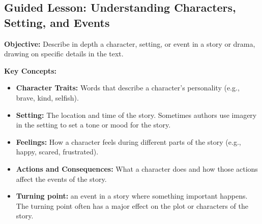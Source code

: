 \documentclass[12pt]{article}
\title{}
\date{}
\begin{document}
\subsection*{Guided Lesson: Understanding Characters, Setting, and Events}
\onehalfspacing

\begin{tcolorbox}[colframe=black!40, colback=gray!5, 
coltitle=black, colbacktitle=black!20, fonttitle=\bfseries\Large, 
title=Learning Objective, halign title=center, left=5pt, right=5pt, top=5pt, bottom=15pt]
\textbf{Objective:} Describe in depth a character, setting, or event in a story or drama, drawing on specific details in the text.
\end{tcolorbox}

\vspace{1em}

\begin{tcolorbox}[colframe=black!60, colback=white, 
coltitle=black, colbacktitle=black!15, fonttitle=\bfseries\Large, 
title=Key Concepts and Vocabulary, halign title=center, left=10pt, right=10pt, top=10pt, bottom=15pt]
\textbf{Key Concepts:}
\begin{itemize}
    \item \textbf{Character Traits:} Words that describe a character’s personality (e.g., brave, kind, selfish).
    \item \textbf{Setting:} The location and time of the story. Sometimes authors use imagery in the setting to set a tone or mood for the story.
    \item \textbf{Feelings:} How a character feels during different parts of the story (e.g., happy, scared, frustrated).
    \item \textbf{Actions and Consequences:} What a character does and how those actions affect the events of the story.
    \item \textbf{Turning point:} an event in a story where something important happens. The turning point often has a major effect on the plot or characters of the story.
\end{itemize}
\end{tcolorbox}

\vspace{1em}
\end{document}
